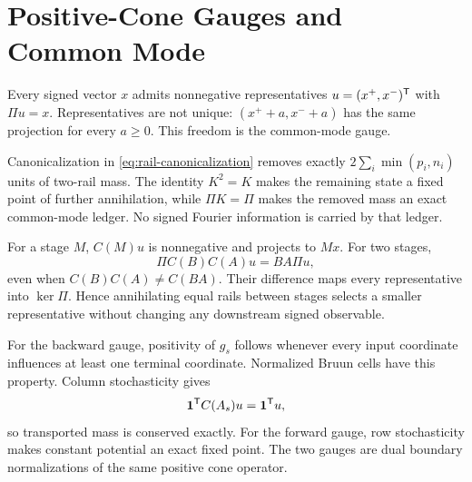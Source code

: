 \section{Positive-Cone Gauges and Common Mode}
\label{app:cone}

Every signed vector $x$ admits nonnegative representatives
$u=(x^+,x^-)^{\mathsf{T}}$ with $\Pi u=x$.  Representatives are not unique:
$(x^++a,x^-+a)$ has the same projection for every $a\ge0$.  This freedom is
the common-mode gauge.

Canonicalization in \eqref{eq:rail-canonicalization} removes exactly
$2\sum_i\min(p_i,n_i)$ units of two-rail mass.  The identity $K^2=K$ makes the
remaining state a fixed point of further annihilation, while $\Pi K=\Pi$ makes
the removed mass an exact common-mode ledger.  No signed Fourier information is
carried by that ledger.

For a stage $M$, $C(M)u$ is nonnegative and projects to $Mx$.  For two stages,
\begin{equation}
 \Pi C(B)C(A)u=BA\Pi u,
 \label{eq:cone-two-stage}
\end{equation}
even when $C(B)C(A)\ne C(BA)$.  Their difference maps every representative into
$\ker\Pi$.  Hence annihilating equal rails between stages selects a smaller
representative without changing any downstream signed observable.

For the backward gauge, positivity of $g_s$ follows whenever every input
coordinate influences at least one terminal coordinate.  Normalized Bruun
cells have this property.  Column stochasticity gives
\begin{equation}
 \bm{1}^{\mathsf{T}}C(A_s)u=\bm{1}^{\mathsf{T}}u,
\end{equation}
so transported mass is conserved exactly.  For the forward gauge, row
stochasticity makes constant potential an exact fixed point.  The two gauges
are dual boundary normalizations of the same positive cone operator.
